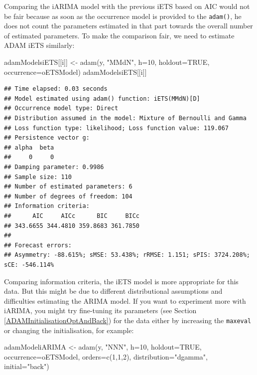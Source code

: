 \documentclass[
]{book}
\newenvironment{Shaded}{\begin{snugshade}}{\end{snugshade}}
\newcommand{\AttributeTok}[1]{\textcolor[rgb]{0.77,0.63,0.00}{#1}}
\newcommand{\ConstantTok}[1]{\textcolor[rgb]{0.00,0.00,0.00}{#1}}
\newcommand{\DecValTok}[1]{\textcolor[rgb]{0.00,0.00,0.81}{#1}}
\newcommand{\FunctionTok}[1]{\textcolor[rgb]{0.00,0.00,0.00}{#1}}
\newcommand{\NormalTok}[1]{#1}
\newcommand{\OtherTok}[1]{\textcolor[rgb]{0.56,0.35,0.01}{#1}}
\newcommand{\StringTok}[1]{\textcolor[rgb]{0.31,0.60,0.02}{#1}}
\theoremstyle{definition}
\theoremstyle{definition}
\theoremstyle{definition}
\theoremstyle{definition}
\theoremstyle{remark}
\begin{document}
Comparing the iARIMA model with the previous iETS based on AIC would not be fair because as soon as the occurrence model is provided to the \texttt{adam()}, he does not count the parameters estimated in that part towards the overall number of estimated parameters. To make the comparison fair, we need to estimate ADAM iETS similarly:

\begin{Shaded}
\begin{Highlighting}[]
\NormalTok{adamModelsiETS[[i]] }\OtherTok{\textless{}{-}} \FunctionTok{adam}\NormalTok{(y, }\StringTok{"MMdN"}\NormalTok{, }\AttributeTok{h=}\DecValTok{10}\NormalTok{, }\AttributeTok{holdout=}\ConstantTok{TRUE}\NormalTok{,}
                            \AttributeTok{occurrence=}\NormalTok{oETSModel)}
\NormalTok{adamModelsiETS[[i]]}
\end{Highlighting}
\end{Shaded}

\begin{verbatim}
## Time elapsed: 0.03 seconds
## Model estimated using adam() function: iETS(MMdN)[D]
## Occurrence model type: Direct
## Distribution assumed in the model: Mixture of Bernoulli and Gamma
## Loss function type: likelihood; Loss function value: 119.067
## Persistence vector g:
## alpha  beta 
##     0     0 
## Damping parameter: 0.9986
## Sample size: 110
## Number of estimated parameters: 6
## Number of degrees of freedom: 104
## Information criteria:
##      AIC     AICc      BIC     BICc 
## 343.6655 344.4810 359.8683 361.7850 
## 
## Forecast errors:
## Asymmetry: -88.615%; sMSE: 53.438%; rRMSE: 1.151; sPIS: 3724.208%; sCE: -546.114%
\end{verbatim}

Comparing information criteria, the iETS model is more appropriate for this data. But this might be due to different distributional assumptions and difficulties estimating the ARIMA model. If you want to experiment more with iARIMA, you might try fine-tuning its parameters (see Section \ref{ADAMInitialisationOptAndBack}) for the data either by increasing the \texttt{maxeval} or changing the initialisation, for example:

\begin{Shaded}
\begin{Highlighting}[]
\NormalTok{adamModeliARIMA }\OtherTok{\textless{}{-}} \FunctionTok{adam}\NormalTok{(y, }\StringTok{"NNN"}\NormalTok{, }\AttributeTok{h=}\DecValTok{10}\NormalTok{, }\AttributeTok{holdout=}\ConstantTok{TRUE}\NormalTok{,}
                        \AttributeTok{occurrence=}\NormalTok{oETSModel, }\AttributeTok{orders=}\FunctionTok{c}\NormalTok{(}\DecValTok{1}\NormalTok{,}\DecValTok{1}\NormalTok{,}\DecValTok{2}\NormalTok{),}
                        \AttributeTok{distribution=}\StringTok{"dgamma"}\NormalTok{, }\AttributeTok{initial=}\StringTok{"back"}\NormalTok{)}
\end{Highlighting}
\end{Shaded}
\end{document}

